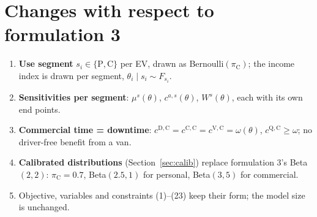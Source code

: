 \documentclass[12pt,a4paper]{article}
\begin{document}
\section{Changes with respect to formulation 3}
\begin{enumerate}[itemsep=2pt]
  \item \textbf{Use segment} $s_i\in\{\mathrm P,\mathrm C\}$ per EV, drawn as Bernoulli$(\pi_{\mathrm C})$; the income index is drawn per segment, $\theta_i\mid s_i\sim F_{s_i}$.
  \item \textbf{Sensitivities per segment}: $\mu^{s}(\theta)$, $c^{a,s}(\theta)$, $W^{s}(\theta)$, each with its own end points.
  \item \textbf{Commercial time = downtime}: $c^{\mathrm D,\mathrm C}=c^{\mathrm C,\mathrm C}=c^{\mathrm V,\mathrm C}=\omega(\theta)$, $c^{\mathrm Q,\mathrm C}\ge\omega$; no driver-free benefit from a van.
  \item \textbf{Calibrated distributions} (Section~\ref{sec:calib}) replace formulation 3's Beta$(2,2)$: $\pi_{\mathrm C}=0.7$, Beta$(2.5,1)$ for personal, Beta$(3,5)$ for commercial.
  \item Objective, variables and constraints (1)--(23) keep their form; the model size is unchanged.
\end{enumerate}
\end{document}
